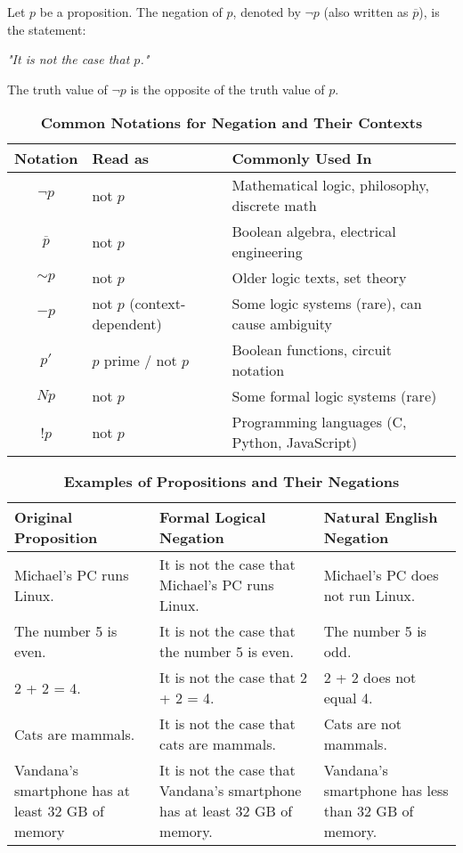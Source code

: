 \vspace{5pt}
\begin{tcolorbox}[title=Definition: Negation]
Let $p$ be a proposition. The negation of $p$, denoted by $\neg p$ (also written as $\overline{p}$), is the statement:  
\begin{center}
\textit{"It is not the case that $p$."}
\end{center}
The truth value of $\neg p$ is the opposite of the truth value of $p$.
\end{tcolorbox}
\vspace{5pt}
\begin{table}[h!]
\centering
\caption*{\textbf{Common Notations for Negation and Their Contexts}}
\begin{tabular}{|c|l|l|}
\hline
\rowcolor{gray!20}
\textbf{Notation} & \textbf{Read as} & \textbf{Commonly Used In} \\
\hline
$\neg p$       & not $p$            & Mathematical logic, philosophy, discrete math \\
$\overline{p}$ & not $p$            & Boolean algebra, electrical engineering \\
$\sim p$       & not $p$            & Older logic texts, set theory \\
$-p$           & not $p$ (context-dependent) & Some logic systems (rare), can cause ambiguity \\
$p'$           & $p$ prime / not $p$ & Boolean functions, circuit notation \\
$Np$           & not $p$            & Some formal logic systems (rare) \\
!$p$           & not $p$            & Programming languages (C, Python, JavaScript) \\
\hline
\end{tabular}
\end{table}
\begin{table}[h!]
\centering
\caption*{\textbf{Examples of Propositions and Their Negations}}
\begin{tabular}{|p{5.5cm}|p{5.5cm}|p{5.5cm}|}
\hline
\rowcolor{gray!20}
\textbf{Original Proposition} & \textbf{Formal Logical Negation} & \textbf{Natural English Negation} \\
\hline
Michael’s PC runs Linux. & It is not the case that Michael’s PC runs Linux. & Michael’s PC does not run Linux. \\
The number 5 is even. & It is not the case that the number 5 is even. & The number 5 is odd. \\
2 + 2 = 4. & It is not the case that 2 + 2 = 4. & 2 + 2 does not equal 4. \\
Cats are mammals. & It is not the case that cats are mammals. & Cats are not mammals. \\
\hline
Vandana’s smartphone has at least 32 GB of memory & It is not the case that Vandana’s smartphone has at least 32 GB of memory. & Vandana’s smartphone has less than 32 GB of memory. \\ \hline
\end{tabular}
\end{table}
